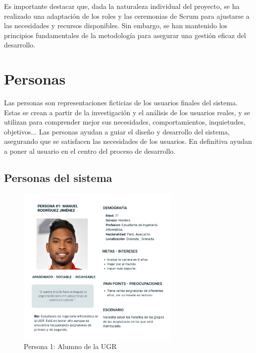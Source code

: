 Es importante destacar que, dada la naturaleza individual del proyecto, se ha realizado una adaptación de los roles y las ceremonias de Scrum para ajustarse a las necesidades y recursos disponibles. 
Sin embargo, se han mantenido los principios fundamentales de la metodología para asegurar una gestión eficaz del desarrollo.

\section{Personas}

Las personas son representaciones ficticias de los usuarios finales del sistema. Estas se crean a partir de la investigación y el análisis de los usuarios reales, y se utilizan para comprender mejor sus necesidades,
 comportamientos, inquietudes, objetivos... \newline
 Las personas ayudan a guiar el diseño y desarrollo del sistema, asegurando que se satisfacen las necesidades de los usuarios. En definitiva ayudan a poner al usuario en el centro del proceso de desarrollo.

\subsection{Personas del sistema}

\begin{figure}[H]
    \centering
    \includegraphics[width=0.7\textwidth]{figures/04_persona_1.png}
    \caption{Persona 1: Alumno de la UGR}
    \label{fig:persona_1}
\end{figure}

